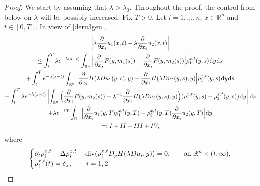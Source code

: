 \documentclass{amsart}
\theoremstyle{remark}
\theoremstyle{definition}
\theoremstyle{Claim}
\newcommand{\R}{\mathbb{R}}
\newcommand{\dd}{\hspace{0.7pt}{\rm d}}
\theoremstyle{plain}
\begin{document}
	\begin{proof} We start by assuming that $\lambda > \lambda_0$. Throughout the proof, the control from below on $\lambda$ will be possibly increased. Fix $T>0$. Let $i=1,\dots,n$, $x\in \mathbb{R}^n$ and $t\in [0,T]$. In view of \eqref{deru3gen},	
	\begin{multline}\label{three}
		\left|\lambda \frac{\partial}{\partial x_i} u_1(x,t) - \lambda \frac{\partial}{\partial x_i} u_2(x,t)\right| \\ \le
		\int_{t}^{T}  \lambda e^{-\lambda (s-t)} \int_{\R^n} \Big| \frac{\partial}{\partial x_i} F(y,m_1(s)) - \frac{\partial}{\partial x_i} F(y,m_2(s)) \Big| \rho_1^{x, t}(y,s) \dd y \dd s  \\
		+\int_{t}^{T} e^{-\lambda (s-t)} \int_{\R^n} \Big| \frac{\partial}{\partial x_i}  H(\lambda Du_1(y,s),y) - \frac{\partial}{\partial x_i}  H(\lambda Du_2(y,s),y) \Big| \rho_1^{x, t}(y,s) \dd y \dd s \\
		+\int_{t}^{T}  \lambda e^{-\lambda (s-t)} \left| \int_{\R^n} \Big( \frac{\partial}{\partial x_i} F(y,m_2(s)) - \lambda^{-1} \frac{\partial}{\partial x_i}  H(\lambda Du_2(y,s),y) \Big)(\rho_1^{x, t}(y,s) - \rho_2^{x, t}(y,s)) \dd y \right| \dd s \\
		+\lambda e^{-\lambda T}\int_{\R^n}\Big| \frac{\partial}{\partial x_i}u_1(y,T)\rho_1^{x, t}(y,T)-\rho_2^{x, t}(y,T)\frac{\partial}{\partial x_i}u_2(y,T)\Big| \dd y  \\ =: I + II + III+IV,
	\end{multline}
	where 
		\[
		\begin{cases}
			\partial_t\rho_i^{x, t}-\Delta \rho_i^{x, t}-{ \rm div}(\rho_i^{x, t}D_pH(\lambda Du_i,y))=0,\quad & \text{on $\mathbb{R}^n \times (t,\infty)$},\\
			\rho_i^{x, t}(t)=\delta_{x}, \qquad i = 1,2.
		\end{cases}
		\]
		

\end{proof}
\end{document}
